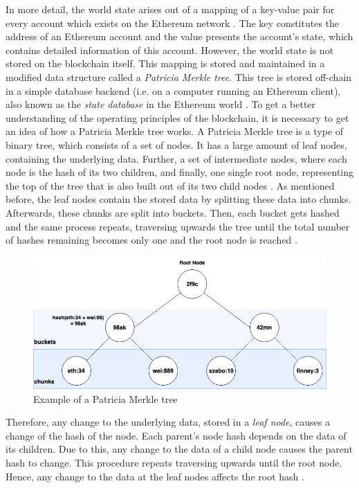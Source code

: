 In more detail, the world state arises out of a mapping of a key-value pair for every account which exists 
on the Ethereum network . 
The key constitutes the address of an Ethereum account and the value presents 
the account's state, which contains detailed information of this account. 
However, the world state is not stored on the blockchain itself. 
This mapping is stored and maintained in a modified data structure 
called a \textit{Patricia Merkle tree}. This tree is stored off-chain 
in a simple database backend (i.e. on a computer running an Ethereum client), 
also known as the \textit{state database} in the Ethereum world . 
To get a better understanding of the operating principles of the blockchain, 
it is necessary to get an idea of how a Patricia Merkle tree works. 
A Patricia Merkle tree is a type of binary tree, which consists 
of a set of nodes. It has a large amount of 
leaf nodes, containing the underlying data. 
Further, a set of intermediate nodes, where each node is 
the hash of its two children, and finally, one single root node, 
representing the top of the tree that is also built out of its 
two child nodes  .
As mentioned before, the leaf nodes contain the stored data 
by splitting these data into chunks. Afterwards, these chunks are split into buckets. 
Then, each bucket gets hashed and the same process repeats, traversing 
upwards the tree until the total number of hashes remaining becomes 
only one and the root node is reached . 

\begin{figure}[htbp]
	\centering
	\includegraphics[width=.75\linewidth]{./figures/merkle_tree.png}
	\caption{Example of a Patricia Merkle tree}
	\label{figure:merkle_tree}
\end{figure}

Therefore, any change to the underlying data, stored in a \textit{leaf node}, causes a change
of the hash of the node. Each parent's node hash depends on the data of its children. 
Due to this, any change to the data of a child node causes the parent hash to change. 
This procedure repeats traversing upwards until the root node. 
Hence, any change to the data at the leaf nodes affects the root hash . 

